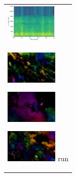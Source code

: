 \begin{figure}[htbp]
\begin{tabular}{l}
\begin{minipage}{0.165\hsize}
\begin{center}
        \end{center}
      \end{minipage}
      \begin{minipage}{0.165\hsize}
        \begin{center}
          \includegraphics[clip, width=2.5cm]{./Figures/sound_run.eps}
        \end{center}
      \end{minipage}
\\  %
      \begin{minipage}{0.165\hsize}
        \begin{center}
          \includegraphics[clip, width=2.5cm]{./Figures/optic_run1.eps}
          \hspace{0.3cm} { }
        \end{center}
      \end{minipage}
      \begin{minipage}{0.165\hsize}
        \begin{center}
          \includegraphics[clip, width=2.5cm]{./Figures/optic_run2.eps}
          \hspace{0.0cm} { }
        \end{center}
      \end{minipage}
      \begin{minipage}{0.165\hsize}
        \begin{center}
          \includegraphics[clip, width=2.5cm]{./Figures/optic_run3.eps}
          \hspace{2.0cm} {run}
        \end{center}
      \end{minipage}
      \begin{minipage}{0.165\hsize}

\end{minipage}
\end{tabular}
\end{figure}

